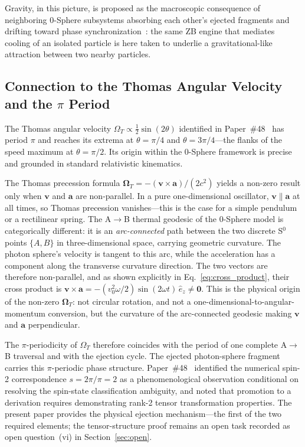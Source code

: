 \documentclass[%
 reprint, amsmath,amssymb, aps, prb, ]{revtex4-2}
\numberwithin{equation}{section}
\newcommand{\iphase}{\theta}
\begin{document}
Gravity, in this picture, is proposed as the macroscopic consequence of neighboring 0-Sphere subsystems absorbing each other's ejected fragments and drifting toward phase synchronization~\cite{hanamura34}: the same ZB engine that mediates cooling of an isolated particle is here taken to underlie a gravitational-like attraction between two nearby particles.

\subsection{Connection to the Thomas Angular Velocity and the $\pi$ Period}
\label{sec:ejection_omega}

The Thomas angular velocity $\Omega_T \propto \tfrac{1}{2}\sin(2\iphase)$ identified in Paper~\#48~\cite{hanamura48} has period $\pi$ and reaches its extrema at $\iphase = \pi/4$ and $\iphase = 3\pi/4$---the flanks of the speed maximum at $\iphase = \pi/2$. Its origin within the 0-Sphere framework is precise and grounded in standard relativistic kinematics.

The Thomas precession formula $\boldsymbol{\Omega}_T = -(\mathbf{v} \times \mathbf{a})/(2c^2)$ yields a non-zero result only when $\mathbf{v}$ and $\mathbf{a}$ are non-parallel. In a pure one-dimensional oscillator, $\mathbf{v} \parallel \mathbf{a}$ at all times, so Thomas precession vanishes---this is the case for a simple pendulum or a rectilinear spring. The A$\to$B thermal geodesic of the 0-Sphere model is categorically different: it is an \emph{arc-connected} path between the two discrete S$^0$ points $\{A,B\}$ in three-dimensional space, carrying geometric curvature. The photon sphere's velocity is tangent to this arc, while the acceleration has a component along the transverse curvature direction. The two vectors are therefore non-parallel, and as shown explicitly in Eq.~\eqref{eq:cross_product}, their cross product is $\mathbf{v} \times \mathbf{a} = -(v_0^2\omega/2)\sin(2\omega t)\,\hat{e}_z \neq \mathbf{0}$. This is the physical origin of the non-zero $\boldsymbol{\Omega}_T$: not circular rotation, and not a one-dimensional-to-angular-momentum conversion, but the curvature of the arc-connected geodesic making $\mathbf{v}$ and $\mathbf{a}$ perpendicular.

The $\pi$-periodicity of $\Omega_T$ therefore coincides with the period of one complete A$\to$B traversal and with the ejection cycle. The ejected photon-sphere fragment carries this $\pi$-periodic phase structure. Paper~\#48~\cite{hanamura48} identified the numerical spin-2 correspondence $s = 2\pi/\pi = 2$ as a phenomenological observation conditional on resolving the spin-state classification ambiguity, and noted that promotion to a derivation requires demonstrating rank-2 tensor transformation properties. The present paper provides the physical ejection mechanism---the first of the two required elements; the tensor-structure proof remains an open task recorded as open question~(vi) in Section~\ref{sec:open}.
\end{document}
